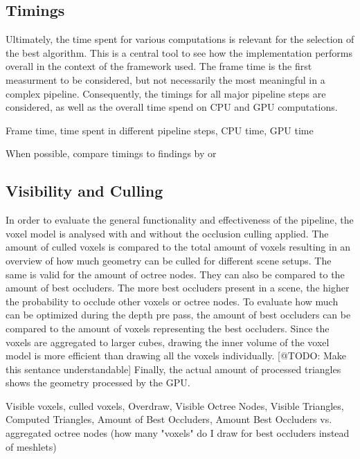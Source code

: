 \subsection*{Timings}

Ultimately, the time spent for various computations is relevant for the selection of the best algorithm. This is 
a central tool to see how the implementation performs overall in the context of the framework used. The frame 
time is the first measurment to be considered, but not necessarily the most meaningful in a complex pipeline. 
Consequently, the timings for all major pipeline steps are considered, as well as the overall time spend on \ac{CPU} 
and \ac{GPU} computations. 



Frame time, 
time spent in different pipeline steps,
CPU time,
GPU time

When possible, compare timings to findings by \cite{Aaltonen2015} or \cite{Remedy2023}




\subsection*{Visibility and Culling}

In order to evaluate the general functionality and effectiveness of the pipeline, the voxel model is analysed 
with and without the occlusion culling applied. The amount of culled voxels is compared to the total amount of 
voxels resulting in an overview of how much geometry can be culled for different scene setups. The same is 
valid for the amount of octree nodes. They can also be compared to the amount of best occluders. The more best 
occluders present in a scene, the higher the probability to occlude other voxels or octree nodes. To evaluate 
how much can be optimized during the depth pre pass, the amount of best occluders can be compared to the amount 
of voxels representing the best occluders. Since the voxels are aggregated to larger cubes, drawing the inner 
volume of the voxel model is more efficient than drawing all the voxels individually. [@TODO: Make this sentance 
understandable]  
Finally, the actual amount of processed triangles shows the geometry processed by 
the \ac{GPU}. 

Visible voxels, culled voxels,
Overdraw, Visible Octree Nodes,
Visible Triangles, Computed Triangles,
Amount of Best Occluders,
Amount Best Occluders vs. aggregated octree nodes (how many "voxels" do I draw for best occluders instead of meshlets)



